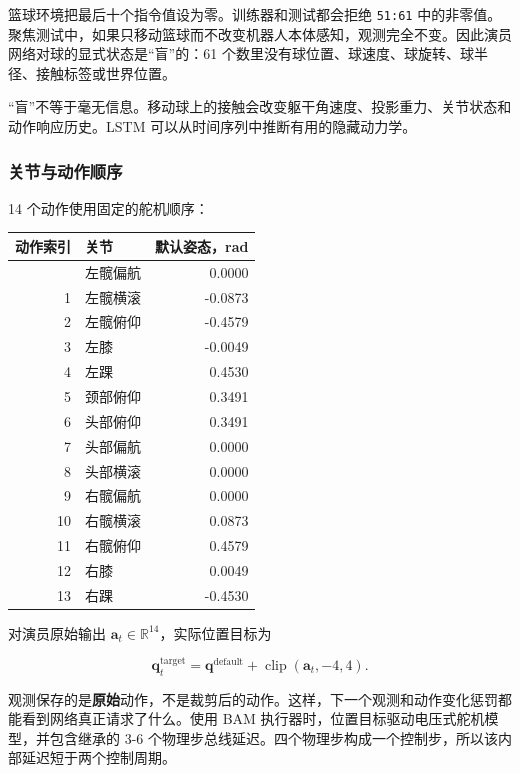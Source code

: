 \documentclass[
  chinese,
  11pt,
  letterpaper,
]{article}
\newcounter{none} %
\begin{document}
篮球环境把最后十个指令值设为零。训练器和测试都会拒绝 \texttt{51:61}
中的非零值。聚焦测试中，如果只移动篮球而不改变机器人本体感知，观测完全不变。因此演员网络对球的显式状态是``盲''的：61
个数里没有球位置、球速度、球旋转、球半径、接触标签或世界位置。

``盲''不等于毫无信息。移动球上的接触会改变躯干角速度、投影重力、关节状态和动作响应历史。LSTM
可以从时间序列中推断有用的隐藏动力学。

\subsubsection{关节与动作顺序}\label{ux5173ux8282ux4e0eux52a8ux4f5cux987aux5e8f}

14 个动作使用固定的舵机顺序：

{\def\LTcaptype{none} %
\begin{longtable}[]{@{}rlr@{}}
\toprule\noalign{}
动作索引 & 关节 & 默认姿态，rad \\
\midrule\noalign{}
\endhead
\bottomrule\noalign{}
\endlastfoot
0 & 左髋偏航 & 0.0000 \\
1 & 左髋横滚 & -0.0873 \\
2 & 左髋俯仰 & -0.4579 \\
3 & 左膝 & -0.0049 \\
4 & 左踝 & 0.4530 \\
5 & 颈部俯仰 & 0.3491 \\
6 & 头部俯仰 & 0.3491 \\
7 & 头部偏航 & 0.0000 \\
8 & 头部横滚 & 0.0000 \\
9 & 右髋偏航 & 0.0000 \\
10 & 右髋横滚 & 0.0873 \\
11 & 右髋俯仰 & 0.4579 \\
12 & 右膝 & 0.0049 \\
13 & 右踝 & -0.4530 \\
\end{longtable}
}

对演员原始输出 \(\mathbf a_t\in\mathbb R^{14}\)，实际位置目标为

\[
\mathbf q^{\text{target}}_t
=\mathbf q^{\text{default}}
+\operatorname{clip}(\mathbf a_t,-4,4).
\]

观测保存的是\textbf{原始}动作，不是裁剪后的动作。这样，下一个观测和动作变化惩罚都能看到网络真正请求了什么。使用
BAM 执行器时，位置目标驱动电压式舵机模型，并包含继承的 3-6
个物理步总线延迟。四个物理步构成一个控制步，所以该内部延迟短于两个控制周期。
\end{document}
